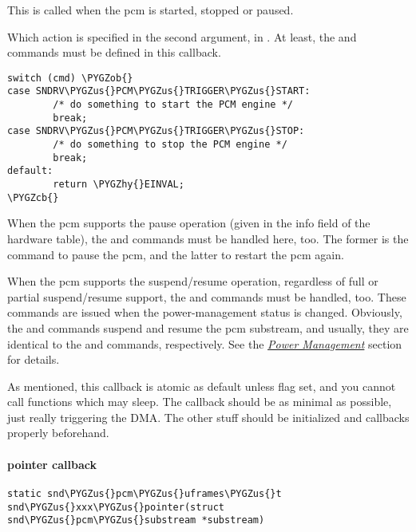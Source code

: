 \documentclass[a4paper,8pt,english]{sphinxmanual}
\def\PYGZus{\char`\_}
\def\PYGZob{\char`\{}
\def\PYGZcb{\char`\}}
\def\PYGZhy{\char`\-}
\begin{document}
This is called when the pcm is started, stopped or paused.

Which action is specified in the second argument,
 in . At least, the 
and  commands must be defined in this callback.

\begin{Verbatim}[commandchars=\\\{\}]
switch (cmd) \PYGZob{}
case SNDRV\PYGZus{}PCM\PYGZus{}TRIGGER\PYGZus{}START:
        /* do something to start the PCM engine */
        break;
case SNDRV\PYGZus{}PCM\PYGZus{}TRIGGER\PYGZus{}STOP:
        /* do something to stop the PCM engine */
        break;
default:
        return \PYGZhy{}EINVAL;
\PYGZcb{}
\end{Verbatim}

When the pcm supports the pause operation (given in the info field of
the hardware table), the  and  commands
must be handled here, too. The former is the command to pause the pcm,
and the latter to restart the pcm again.

When the pcm supports the suspend/resume operation, regardless of full
or partial suspend/resume support, the  and 
commands must be handled, too. These commands are issued when the
power-management status is changed. Obviously, the  and
 commands suspend and resume the pcm substream, and usually,
they are identical to the  and  commands, respectively.
See the {\hyperref[sound/kernel\string-api/writing\string-an\string-alsa\string-driver:power\string-management]{\emph{Power Management}}} section for details.

As mentioned, this callback is atomic as default unless 
flag set, and you cannot call functions which may sleep. The
 callback should be as minimal as possible, just really
triggering the DMA. The other stuff should be initialized
 and  callbacks properly beforehand.


\paragraph{pointer callback}
\label{sound/kernel-api/writing-an-alsa-driver:pointer-callback}
\begin{Verbatim}[commandchars=\\\{\}]
static snd\PYGZus{}pcm\PYGZus{}uframes\PYGZus{}t snd\PYGZus{}xxx\PYGZus{}pointer(struct snd\PYGZus{}pcm\PYGZus{}substream *substream)
\end{Verbatim}
\end{document}
